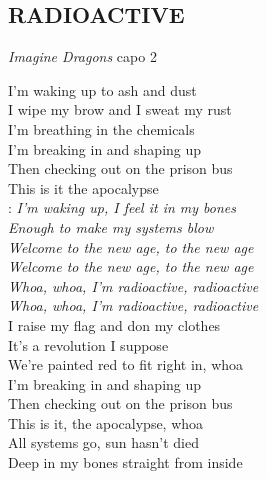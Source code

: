 \begin{flushleft}
	\section*{\Huge RADIOACTIVE}
	\emph{Imagine Dragons} \hspace{10cm} capo 2
\end{flushleft}

I’m waking up to ash and dust\\
I wipe my brow and I sweat my rust\\
I’m breathing in the chemicals\\

I’m breaking in and shaping up\\
Then checking out on the prison bus\\
This is it the apocalypse\\

\textregistered:
\emph{I’m waking up, I feel it in my bones\\
Enough to make my systems blow\\
Welcome to the new age, to the new age\\
Welcome to the new age, to the new age\\
Whoa, whoa, I’m radioactive, radioactive\\
Whoa, whoa, I’m radioactive, radioactive}\\

I raise my flag and don my clothes\\
It’s a revolution I suppose\\
We’re painted red to fit right in, whoa\\

I’m breaking in and shaping up\\
Then checking out on the prison bus\\
This is it, the apocalypse, whoa \hspace{1cm}\textregistered\\

All systems go, sun hasn’t died\\
Deep in my bones straight from inside \hspace{1cm}\textregistered

\newpage
